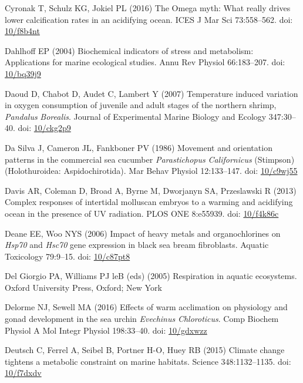 \documentclass[a4paper,10pt, oneside]{memoir}
\begin{document}
\leavevmode\hypertarget{ref-Cyronak2016}{}%
Cyronak T, Schulz KG, Jokiel PL (2016) The Omega myth: What really drives lower calcification rates in an acidifying ocean. ICES J Mar Sci 73:558--562. doi: \href{https://doi.org/10/f8b4nt}{10/f8b4nt}

\leavevmode\hypertarget{ref-Dahlhoff2004}{}%
Dahlhoff EP (2004) Biochemical indicators of stress and metabolism: Applications for marine ecological studies. Annu Rev Physiol 66:183--207. doi: \href{https://doi.org/10/bq39j9}{10/bq39j9}

\leavevmode\hypertarget{ref-Daoud2007}{}%
Daoud D, Chabot D, Audet C, Lambert Y (2007) Temperature induced variation in oxygen consumption of juvenile and adult stages of the northern shrimp, \emph{Pandalus} \emph{Borealis}. Journal of Experimental Marine Biology and Ecology 347:30--40. doi: \href{https://doi.org/10/ckg2p9}{10/ckg2p9}

\leavevmode\hypertarget{ref-DaSilva1986}{}%
Da Silva J, Cameron JL, Fankboner PV (1986) Movement and orientation patterns in the commercial sea cucumber \emph{Parastichopus} \emph{Californicus} (Stimpson) (Holothuroidea: Aspidochirotida). Mar Behav Physiol 12:133--147. doi: \href{https://doi.org/10/c9wj55}{10/c9wj55}

\leavevmode\hypertarget{ref-Davis2013}{}%
Davis AR, Coleman D, Broad A, Byrne M, Dworjanyn SA, Przeslawski R (2013) Complex responses of intertidal molluscan embryos to a warming and acidifying ocean in the presence of UV radiation. PLOS ONE 8:e55939. doi: \href{https://doi.org/10/f4k86c}{10/f4k86c}

\leavevmode\hypertarget{ref-Deane2006}{}%
Deane EE, Woo NYS (2006) Impact of heavy metals and organochlorines on \emph{Hsp70} and \emph{Hsc70} gene expression in black sea bream fibroblasts. Aquatic Toxicology 79:9--15. doi: \href{https://doi.org/10/c87pt8}{10/c87pt8}

\leavevmode\hypertarget{ref-DelGiorgio2005}{}%
Del Giorgio PA, Williams PJ leB (eds) (2005) Respiration in aquatic ecosystems. Oxford University Press, Oxford; New York

\leavevmode\hypertarget{ref-Delorme2016}{}%
Delorme NJ, Sewell MA (2016) Effects of warm acclimation on physiology and gonad development in the sea urchin \emph{Evechinus} \emph{Chloroticus}. Comp Biochem Physiol A Mol Integr Physiol 198:33--40. doi: \href{https://doi.org/10/gdxwzz}{10/gdxwzz}

\leavevmode\hypertarget{ref-Deutsch2015}{}%
Deutsch C, Ferrel A, Seibel B, Portner H-O, Huey RB (2015) Climate change tightens a metabolic constraint on marine habitats. Science 348:1132--1135. doi: \href{https://doi.org/10/f7dxdv}{10/f7dxdv}
\end{document}
